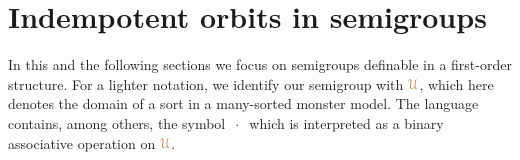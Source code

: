 \documentclass[creche.tex]{subfiles}
\begin{document}
\begin{comment}
\begin{proof}
We can assume that $\mrA$, $\mrB$ and $\mrC$ are $M$-orbits of elements of $\mrU$.
Say ${\mr a}$, ${\mr b}$, and ${\mr c}$ respectively.
As we are working over models,
we can assume that ${\mr a}\nonforkc_{\!A}{\mr b}$ and ${\mr a}{\cdot}{\mr b}\nonforkc_{\!A}{\mr c}$.
By Proposition~\ref{prop_orbits_main} the set on the l.h.s.\@ equals $\O({\mr a}{\cdot}{\mr b}{\cdot}{\mr c}/M)$.
By a similar argument the set on the r.h.s.\@ equals $\O({\mr a'}{\cdot}{\mr b'}{\cdot}{\mr c'}/M)$ for some elements ${\mr a'}$, ${\mr b'}$, and ${\mr c'}$.
Proposition~\ref{prop_semi_associative} proves that inclusion $\subseteq$ holds in general.
But inclusion between orbits amounts to equality.
\end{proof}

\begin{lemma}\label{lem_Hindman}
Let $M$ be a model and assume $\nonforkc_{\!M}$ is $1$-stationary.
If $\mrA$ is minimal among the  $M$-invariant,
idempotent,
type-definable sets then $\mrA=\O({\mr a}/M)$ for some element ${\mr a}$.
\end{lemma}
\begin{proof}
By Corollary~\ref{corol_min_idempotent},
for every ${\mr a}\in\mrA$ the set $\O({\mr a}/M)\cdot_{\!M}\mrA$ is idempotent.
It is also type-definable and contained in $\mrA$,
therefore by minimality $\O({\mr a}/M)\cdot_{\!M}\mrA=\mrA$.
Then there is a ${\mr b}\in\mrA$ such that ${\mr a}\nonforkc_M{\mr b}$ and ${\mr a}{\cdot}{\mr b}={\mr a}$.
By associativity, the set $\O({\mr a}/M)\cdot_{\!M}\O({\mr b}/M)$ is idempotent.
By Corollary~\ref{corol_orbits_associative},
it coincides with $\O({\mr a}/M)$.
The theorem follows by minimality.
\end{proof}
\end{comment}

\section{Indempotent orbits in semigroups}\label{semigroups}

\def\medrel#1{\parbox[t]{6ex}{$\displaystyle\hfil #1$}}
\def\ceq#1#2#3{\parbox[t]{22ex}{$\displaystyle #1$}\medrel{#2}{$\displaystyle #3$}}


In this and the following sections we focus on semigroups definable in a first-order structure.
For a lighter notation, we identify our semigroup with ${\color{brown}\EuScript U}$,
which here denotes the domain of a sort in a many-sorted monster model.
The language contains, among others,
the symbol \emph{$\ \cdot\ $} which is interpreted as a binary associative operation on ${\color{brown}\EuScript U}$.
\end{document}
